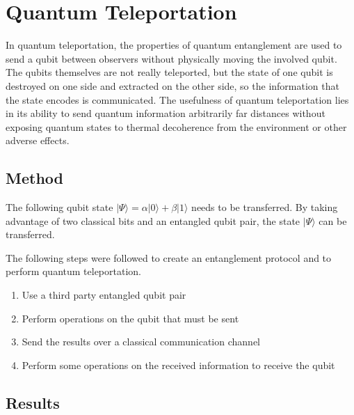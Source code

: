 \renewcommand{\chaptername}{March 15th: Lab}
\chapter{Quantum Teleportation}
In quantum teleportation, the properties of quantum entanglement are used to send a qubit between observers without physically moving the involved qubit. The qubits themselves are not really teleported, but the state of one qubit is destroyed on one side and extracted on the other side, so the information that the state encodes is communicated. The usefulness of quantum teleportation lies in its ability to send quantum information arbitrarily far distances without exposing quantum states to thermal decoherence from the environment or other adverse effects.

\section{Method}

The following qubit state  $|\Psi \rangle = \alpha |0 \rangle + \beta |1 \rangle$ needs to be transferred. By taking advantage of two classical bits and an entangled qubit pair, the state $|\Psi \rangle$ can be transferred.

The following steps were followed to create an entanglement protocol and to perform quantum teleportation.

\begin{enumerate}
    \item Use a third party entangled qubit pair
    \item Perform operations on the qubit that must be sent
    \item Send the results over a classical communication channel
    \item Perform some operations on the received information to receive the qubit
\end{enumerate}

\section{Results}

